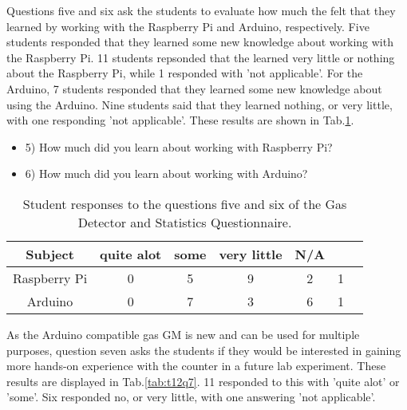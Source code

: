 Questions five and six ask the students to evaluate how much the felt that they learned by working with the Raspberry Pi and Arduino, respectively.
Five students responded that they learned some new knowledge about working with the Raspberry Pi.
11 students repsonded that the learned very little or nothing about the Raspberry Pi, while 1 responded with 'not applicable'.
For the Arduino, 7 students responded that they learned some new knowledge about using the Arduino.
Nine students said that they learned nothing, or very little, with one responding 'not applicable'.
These results are shown in Tab.\ref{tab:t12q56}.

\begin{table}[htpb]
  \scriptsize
  \begin{center}
    \caption{\scriptsize Student responses to the questions five and six of the Gas Detector and Statistics Questionnaire.}
    \label{tab:t12q56}
    \begin{itemize}
    \item 5) How much did you learn about working with Raspberry Pi?
    \item 6) How much did you learn about working with Arduino?
      
    \end{itemize}
    

    \begin{tabular}{|c | c | c | c | c | c | c|}
      \hline
      Subject & quite alot & some & very little & N/A\\
      \hline
      Raspberry Pi & 0 & 5 & 9 & 2 & 1 \\
      \hline
      Arduino & 0 & 7 & 3 & 6 & 1 \\
      \hline
    \end{tabular}
  \end{center}%
\end{table}


As the Arduino compatible gas GM is new and can be used for multiple purposes, question seven asks the students if they would be interested in gaining more hands-on experience with the counter in a future lab experiment.
These results are displayed in Tab.\ref{tab:t12q7}.
11 responded to this with 'quite alot' or 'some'.
Six responded no, or very little, with one answering 'not applicable'.

